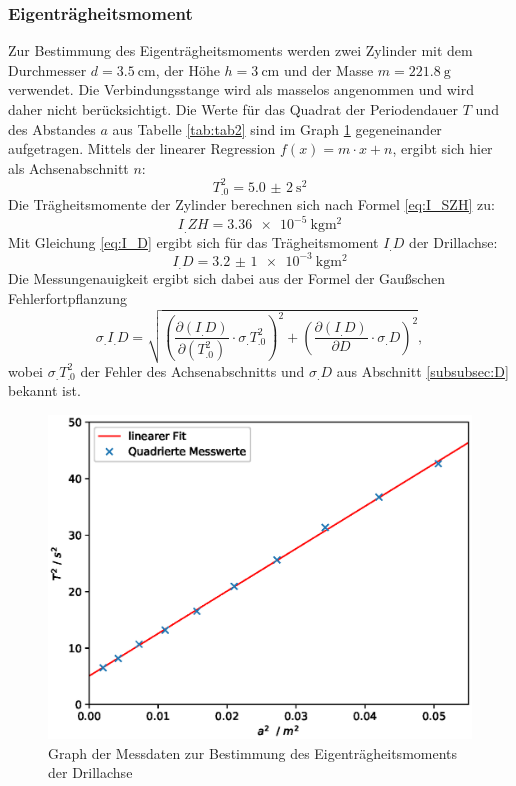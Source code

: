 \subsubsection{Eigenträgheitsmoment}\label{subsubsec:I_D}
Zur Bestimmung des Eigenträgheitsmoments werden zwei Zylinder mit dem Durchmesser $d = \SI{3,5}{\centi\metre}$, der Höhe $h = \SI{3}{\centi\metre}$ und der Masse $m = \SI{221,8}{\gram}$ verwendet.\newline
Die Verbindungsstange wird als masselos angenommen und wird daher nicht berücksichtigt.
Die Werte für das Quadrat der Periodendauer $T$ und des Abstandes $a$ aus Tabelle \ref{tab:tab2} sind im Graph \ref{fig:abb2} gegeneinander aufgetragen. Mittels der linearer Regression $f(x) = m \cdot x + n$\cite{matplotlib}, ergibt sich hier als Achsenabschnitt $n$: \[T_.0^2=\SI{5,0(2)}{\second\squared}\]
Die Trägheitsmomente der Zylinder berechnen sich nach Formel \eqref{eq:I_SZH} zu:
\[I_.{ZH}=\SI{3,36e-5}{\kilogram\metre\squared}\]
Mit Gleichung \eqref{eq:I_D} ergibt sich für das Trägheitsmoment $I_.D$ der Drillachse:
\[I_.D=\SI{3,2(1)e-3}{\kilogram\metre\squared}\]
Die Messungenauigkeit ergibt sich dabei aus der Formel der Gaußschen Fehlerfortpflanzung
\[\sigma_.{I_.D}= \sqrt{\left(\frac{\partial (I_.D)}{\partial (T^2_.0)} \cdot \sigma_.{T^2_.0}\right)^2+\left(\frac{\partial (I_.D)}{\partial D}\cdot\sigma_.D\right)^2},\]
wobei $\sigma_.{T^2_.0}$ der Fehler des Achsenabschnitts und $\sigma_.D$ aus Abschnitt \ref{subsubsec:D} bekannt ist.
\begin{figure}
\centering
\includegraphics[scale = .75,keepaspectratio]
	{content/images/plot1.eps}
\caption{Graph der Messdaten zur Bestimmung des Eigenträgheitsmoments der Drillachse}\label{fig:abb2}
\end{figure}
